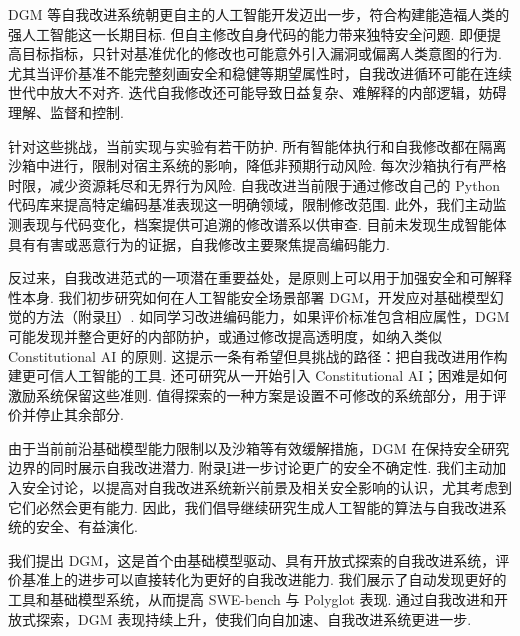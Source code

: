 DGM 等自我改进系统朝更自主的人工智能开发迈出一步，符合构建能造福人类的强人工智能这一长期目标\cite{dgm-schmidhuber1987evolutionary,dgm-clune2019ai,dgm-markoff2016machines,dgm-lehman2023machine}. 但自主修改自身代码的能力带来独特安全问题. 即便提高目标指标，只针对基准优化的修改也可能意外引入漏洞或偏离人类意图的行为\cite{dgm-bostrom2020ethical}. 尤其当评价基准不能完整刻画安全和稳健等期望属性时，自我改进循环可能在连续世代中放大不对齐. 迭代自我修改还可能导致日益复杂、难解释的内部逻辑，妨碍理解、监督和控制\cite{dgm-sheth2025safety,dgm-anwar2024foundational,dgm-greenblatt2024alignment,dgm-ganguli2022red}.

针对这些挑战，当前实现与实验有若干防护. 所有智能体执行和自我修改都在隔离沙箱中进行，限制对宿主系统的影响，降低非预期行动风险. 每次沙箱执行有严格时限，减少资源耗尽和无界行为风险. 自我改进当前限于通过修改自己的 Python 代码库来提高特定编码基准表现这一明确领域，限制修改范围. 此外，我们主动监测表现与代码变化，档案提供可追溯的修改谱系以供审查. 目前未发现生成智能体具有有害或恶意行为的证据，自我修改主要聚焦提高编码能力.

反过来，自我改进范式的一项潜在重要益处，是原则上可以用于加强安全和可解释性本身. 我们初步研究如何在人工智能安全场景部署 DGM，开发应对基础模型幻觉的方法（附录\hyperref[dgm-app:dgm-halluc]{H}）. 如同学习改进编码能力，如果评价标准包含相应属性\cite{dgm-rosser2025agentbreeder}，DGM 可能发现并整合更好的内部防护，或通过修改提高透明度，如纳入类似 Constitutional AI 的原则\cite{dgm-bai2022constitutional}. 这提示一条有希望但具挑战的路径：把自我改进用作构建更可信人工智能的工具. 还可研究从一开始引入 Constitutional AI；困难是如何激励系统保留这些准则. 值得探索的一种方案是设置不可修改的系统部分，用于评价并停止其余部分.

由于当前前沿基础模型能力限制以及沙箱等有效缓解措施，DGM 在保持安全研究边界的同时展示自我改进潜力. 附录\hyperref[dgm-app:safety]{I}进一步讨论更广的安全不确定性. 我们主动加入安全讨论，以提高对自我改进系统新兴前景及相关安全影响的认识，尤其考虑到它们必然会更有能力\cite{dgm-yudkowsky2008artificial,dgm-bostrom2002a,dgm-ecoffet2020open,dgm-bengio2024managing,dgm-clune2019ai}. 因此，我们倡导继续研究生成人工智能的算法\cite{dgm-clune2019ai}与自我改进系统的安全、有益演化.

我们提出 DGM，这是首个由基础模型驱动、具有开放式探索的自我改进系统，评价基准上的进步可以直接转化为更好的自我改进能力. 我们展示了自动发现更好的工具和基础模型系统，从而提高 SWE-bench 与 Polyglot 表现. 通过自我改进和开放式探索，DGM 表现持续上升，使我们向自加速、自我改进系统更进一步.

